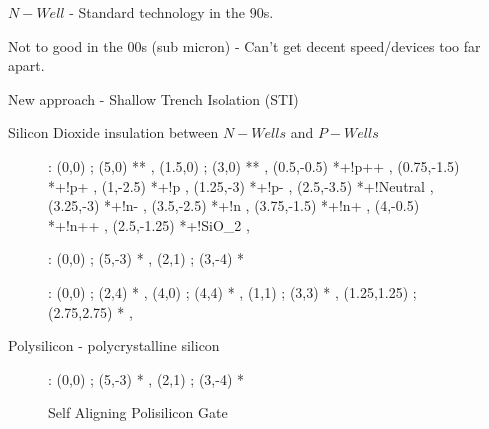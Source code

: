 \documentclass[a4paper,12pt]{article}
\begin{document}
$N-Well$ - Standard technology in the $90$s.

Not to good in the $00$s (sub micron) - Can't get decent speed/devices
too far apart.

New approach - Shallow Trench Isolation (STI)

Silicon Dioxide insulation between $N-Wells$ and $P-Wells$

\begin{figure}[ht]

\xy<1cm,0cm>:
(0,0) ; (5,0) **\dir{-} ,
(1.5,0) ; (3,0) ** ,
\POS (0.5,-0.5) *+!{p++} ,
\POS (0.75,-1.5) *+!{p+} ,
\POS (1,-2.5) *+!{p} ,
\POS (1.25,-3) *+!{p-} ,
\POS (2.5,-3.5) *+!{Neutral} ,
\POS (3.25,-3) *+!{n-} ,
\POS (3.5,-2.5) *+!{n} ,
\POS (3.75,-1.5) *+!{n+} ,
\POS (4,-0.5) *+!{n++} ,
\POS (2.5,-1.25) *+!{SiO_{2}} ,
\endxy

\end{figure}

\begin{figure}[ht]


\xy<1cm,0cm>:
(0,0) ; (5,-3) *\frm{-} ,
(2,1) ; (3,-4) *\frm{-}
\endxy

\end{figure}

\begin{figure}[ht]


\xy<1cm,0cm>:
(0,0) ; (2,4) *\frm{-} ,
(4,0) ; (4,4) *\frm{-} ,
(1,1) ; (3,3) *\frm{-} ,
(1.25,1.25) ; (2.75,2.75) *\frm{-} ,
\endxy

\end{figure}

Polysilicon - polycrystalline silicon

\begin{figure}[ht]


\xy<1cm,0cm>:
(0,0) ; (5,-3) *\frm{-} ,
(2,1) ; (3,-4) *\frm{-}
\endxy

\caption{Self Aligning Polisilicon Gate}

\end{figure}
\end{document}

